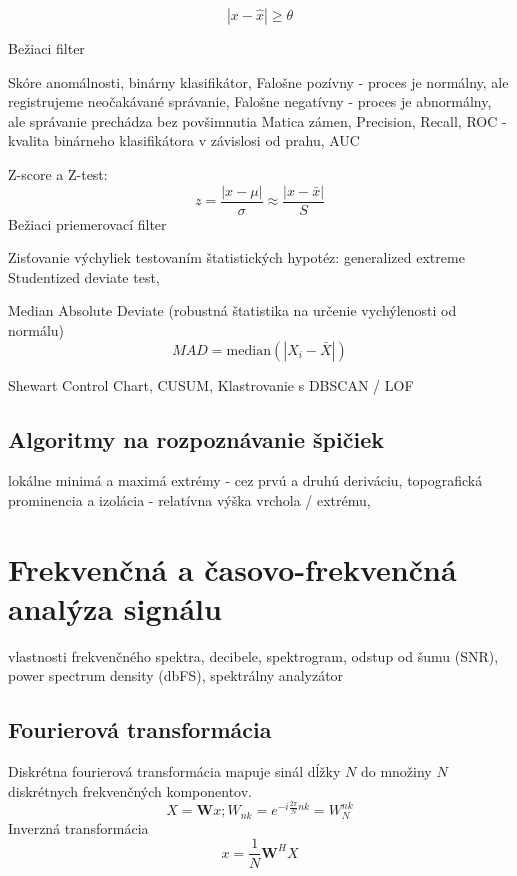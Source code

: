 \cite{review-outlier-datection} \cite{anomaly-detection-algorithms}
\begin{equation}
|x - \hat{x}| \geq \theta 
\end{equation}

Bežiaci filter  
\cite{anomaly-detection-models}

Skóre anomálnosti, 	binárny klasifikátor, 
Falošne pozívny - proces je normálny, ale registrujeme neočakávané správanie, 
Falošne negatívny - proces je abnormálny, ale správanie prechádza bez povšimnutia
Matica zámen, Precision, Recall, 
ROC - kvalita binárneho klasifikátora v závislosi od prahu, AUC
\cite{wsn-outlier-detection-survey}

Z-score a Z-test: 
\begin{equation}
z = \frac{|x - \mu|}{\sigma} \approx \frac{|x - \bar{x}|}{S}
\end{equation}
Bežiaci priemerovací filter \cite{anomaly-detection-models}

Zisťovanie výchyliek testovaním štatistických hypotéz: 
generalized extreme Studentized deviate test, 

Median Absolute Deviate (robustná štatistika na určenie vychýlenosti od normálu)
\begin{equation}
MAD = \mathrm{median}(|X_i - \bar{X}|)
\end{equation}

Shewart Control Chart, 
CUSUM,
Klastrovanie s DBSCAN / LOF
\cite{change-theory}

\subsection{Algoritmy na rozpoznávanie špičiek}
lokálne minimá a maximá extrémy - cez prvú a druhú deriváciu,
topografická prominencia a izolácia - relatívna výška vrchola / extrému, 

\section{Frekvenčná a časovo-frekvenčná analýza signálu}
vlastnosti frekvenčného spektra, decibele, spektrogram, odstup od šumu (SNR), power spectrum density (dbFS), spektrálny analyzátor 

\subsection{Fourierová transformácia}
Diskrétna fourierová transformácia mapuje sinál dĺžky $N$ do množiny $N$ diskrétnych frekvenčných komponentov. \cite{signal-processing}
\begin{equation}
X = \mathbf{W}x; W_{nk} = e^{-i\frac{2\pi}{N}nk} = W_N^{nk}
\end{equation}
Inverzná transformácia
\begin{equation}
x = \frac{1}{N}\mathbf{W}^H X
\end{equation}

